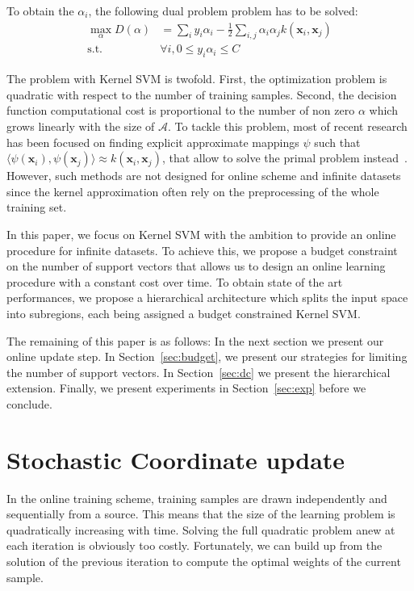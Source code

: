 \documentclass[10pt,final,a4paper]{article}
\newcommand{\x}{\mathbf{x}}
\newcommand{\Acal}{\mathcal{A}}
\begin{document}
To obtain the $\alpha_i$, the following dual problem problem has to be solved:
\begin{align}
	\max_\alpha D(\alpha) &= \sum_i y_i \alpha_i - \frac{1}{2} \sum_{i,j} \alpha_i \alpha_j k(\x_i, \x_j) \\
	\text{s.t. } & \forall i, 0 \leq y_i \alpha_i \leq C
\end{align}

The problem with Kernel SVM is twofold. First, the optimization problem is quadratic with respect to the number of training samples. Second, the decision function computational cost is proportional to the number of non zero $\alpha$ which grows linearly with the size of $\Acal$.
To tackle this problem, most of recent research has been focused on finding explicit approximate mappings $\psi$ such that $\langle \psi(\x_i), \psi(\x_j) \rangle \approx k(\x_i, \x_j)$, that allow to solve the primal problem instead~\cite{le13icml}.
However, such methods are not designed for online scheme and infinite datasets since the kernel approximation often rely on the preprocessing of the whole training set.

In this paper, we focus on Kernel SVM with the ambition to provide an online procedure for infinite datasets.
To achieve this, we propose a budget constraint on the number of support vectors that allows us to design an online learning procedure with a constant cost over time.
To obtain state of the art performances, we propose a hierarchical architecture which splits the input space into subregions, each being assigned a budget constrained Kernel SVM.

The remaining of this paper is as follows: In the next section we present our online update step. In Section~\ref{sec:budget}, we present our strategies for limiting the number of support vectors. In Section~\ref{sec:dc} we present the hierarchical extension. Finally, we present experiments in Section~\ref{sec:exp} before we conclude.

\section{Stochastic Coordinate update}
\label{sec:update}

In the online training scheme, training samples are drawn independently and sequentially from a source.
This means that the size of the learning problem is quadratically increasing with time.
Solving the full quadratic problem anew at each iteration is obviously too costly.
Fortunately, we can build up from the solution of the previous iteration to compute the optimal weights of the current sample.
\end{document}
